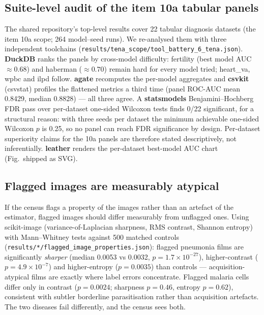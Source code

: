 \subsection{Suite-level audit of the item 10a tabular panels}
The shared repository's top-level results cover 22 tabular diagnosis
datasets (the item 10a scope; 264 model--seed runs). We re-analysed them
with three independent toolchains
(\texttt{results/tena\_scope/tool\_battery\_6\_tena.json}).
\textbf{DuckDB} ranks the panels by cross-model difficulty: fertility
(best model AUC $\approx 0.68$) and haberman ($\approx 0.70$) remain
hard for every model tried; heart\_va, wpbc and ilpd follow.
\textbf{agate} recomputes the per-model aggregates and \textbf{csvkit}
(csvstat) profiles the flattened metrics a third time (panel ROC-AUC
mean 0.8429, median 0.8828) --- all three agree. A \textbf{statsmodels}
Benjamini--Hochberg FDR pass over per-dataset one-sided Wilcoxon tests
finds 0/22 significant, for a structural reason: with three seeds per
dataset the minimum achievable one-sided Wilcoxon $p$ is 0.25, so no
panel can reach FDR significance by design. Per-dataset superiority
claims for the 10a panels are therefore stated descriptively, not
inferentially. \textbf{leather} renders the per-dataset best-model AUC
chart (Fig.\ shipped as SVG).
\subsection{Flagged images are measurably atypical}
If the census flags a property of the images rather than an artefact of
the estimator, flagged images should differ measurably from unflagged
ones. Using scikit-image (variance-of-Laplacian sharpness, RMS contrast,
Shannon entropy) with Mann--Whitney tests against 500 matched controls
(\texttt{results/*/flagged\_image\_properties.json}): flagged pneumonia
films are significantly \emph{sharper} (median 0.0053 vs 0.0032,
$p{=}1.7{\times}10^{-27}$), higher-contrast ($p{=}4.9{\times}10^{-7}$)
and higher-entropy ($p{=}0.0035$) than controls --- acquisition-atypical
films are exactly where label errors concentrate. Flagged malaria cells
differ only in contrast ($p{=}0.0024$; sharpness $p{=}0.46$, entropy
$p{=}0.62$), consistent with subtler borderline parasitisation rather
than acquisition artefacts. The two diseases fail differently, and the
census sees both.
